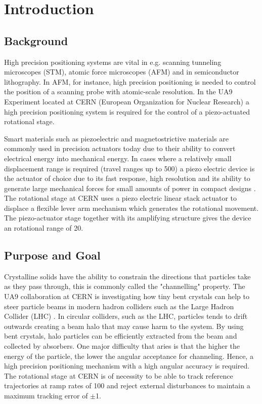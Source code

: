 \chapter{Introduction}\label{cha:intro}

\section{Background}

High precision positioning systems are vital in e.g. scanning tunneling microscopes (STM), atomic force microscopes (AFM) and in semiconductor lithography. In AFM, for instance, high precision positioning is needed to control the position of a scanning probe with atomic-scale resolution. In the UA9 Experiment located at CERN (European Organization for Nuclear Research) a high precision positioning system is required for the control of a piezo-actuated rotational stage.

Smart materials such as piezoelectric and magnetostrictive materials are commonly used in precision actuators today due to their ability to convert electrical energy into mechanical energy. %
In cases where a relatively small displacement range is required (travel ranges up to \unit{500}{\micro\meter}) a piezo electric device is the actuator of choice due to its fast response, high resolution and its ability to generate large mechanical forces for small amounts of power in compact designs \citep{SurveyOfControlIssues:2007}. The rotational stage at CERN uses a piezo electric linear stack actuator to displace a flexible lever arm mechanism which generates the rotational movement. The piezo-actuator stage together with its amplifying structure gives the device an rotational range of \unit{20}{\milli\rad}.

\section{Purpose and Goal}
Crystalline solids have the ability to constrain the directions that particles take as they pass through, this is commonly called the "channelling" property. The UA9 collaboration at CERN is investigating how tiny bent crystals can help to steer particle beams in modern hadron colliders such as the Large Hadron Collider (LHC) \citep{WebsiteUA9:2016}. In circular colliders, such as the LHC, particles tends to drift outwards creating a beam halo that may cause harm to the system. By using bent crystals, halo particles can be efficiently extracted from the beam and collected by absorbers.
One major difficulty that aries is that the higher the energy of the particle, the lower the angular acceptance for channeling. Hence, a high precision positioning mechanism with a high angular accuracy is required. The rotational stage at CERN is of necessity to be able to track reference trajectories at ramp rates of \unit{100}{\micro\radianpersecond} and reject external disturbances to maintain a maximum tracking error of $\pm$\unit{1}{\micro\rad}.

